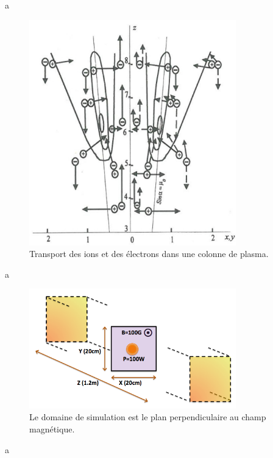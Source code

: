 \begin{refsection}
a

\begin{figure}[htbp]
\centering
\includegraphics[width=0.8\textwidth]{figures/4-magnetizedColumn.jpg}
{\caption{Transport des ions et des électrons dans une colonne de
plasma\parencite{Rozhansky}.}
\label{4-magnetizedColumn}}
\end{figure}

a

\begin{figure}[htbp]
\centering
\includegraphics[width=0.8\textwidth]{figures/4-cybeleSimDomain.png}
{\caption{Le domaine de simulation est le plan perpendiculaire au champ
magnétique.}
\label{4-cybeleSimDomain}}
\end{figure}

a


\end{refsection}
